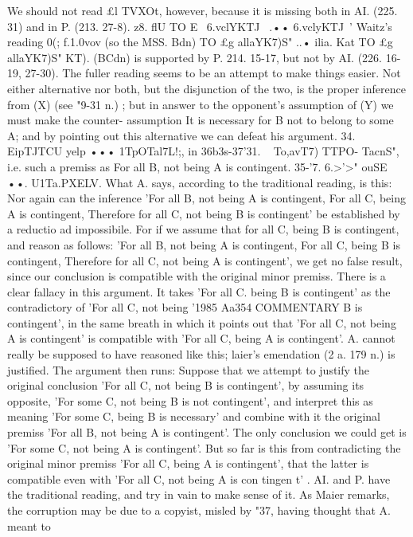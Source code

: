 {{{{{{{{{We should not read £l TVXOt, however, because it is missing both
in AI. (225. 31) and in P. (213. 27-8).
z8. flU TO E~ 6.vclYKTJ~ .•• 6.vclyKTJ~' Waitz's reading 0(; f.1.0vov
(so the MSS. Bdn) TO £g allaYK7)S" ..• ilia. Kat TO £g allaYK7)S" KT).
(BCdn) is supported by P. 214. 15-17, but not by AI. (226. 16-19,
27-30). The fuller reading seems to be an attempt to make things
easier. Not either alternative nor both, but the disjunction of the
two, is the proper inference from (X) (see "9-31 n.) ; but in answer
to the opponent's assumption of (Y) we must make the counter-
assumption It is necessary for B not to belong to some A; and
by pointing out this alternative we can defeat his argument.
34. EipTJTCU yelp ••• 1TpOTal7L!;, in 36b3s-37'31. ~ To,avT7) TTPO-
TacnS", i.e. such a premiss as For all B, not being A is contingent.
35-'7. 6.>'>" ouSE ••. U1Ta.PXELV. What A. says, according to the
traditional reading, is this: Nor again can the inference 'For all
B, not being A is contingent, For all C, being A is contingent,
Therefore for all C, not being B is contingent' be established by
a reductio ad impossibile. For if we assume that for all C, being
B is contingent, and reason as follows: 'For all B, not being A
is contingent, For all C, being B is contingent, Therefore for all
C, not being A is contingent', we get no false result, since our
conclusion is compatible with the original minor premiss.
There is a clear fallacy in this argument. It takes 'For all C.
being B is contingent' as the contradictory of 'For all C, not being
'1985
Aa354
COMMENTARY
B is contingent', in the same breath in which it points out that
'For all C, not being A is contingent' is compatible with 'For all
C, being A is contingent'. A. cannot really be supposed to have
reasoned like this; l\1aier's emendation (2 a. 179 n.) is justified.
The argument then runs: Suppose that we attempt to justify
the original conclusion 'For all C, not being B is contingent', by
assuming its opposite, 'For some C, not being B is not contingent',
and interpret this as meaning 'For some C, being B is necessary'
and combine with it the original premiss 'For all B, not being A
is contingent'. The only conclusion we could get is 'For some
C, not being A is contingent'. But so far is this from contradicting
the original minor premiss 'For all C, being A is contingent', that
the latter is compatible even with 'For all C, not being A is
con tingen t' .
AI. and P. have the traditional reading, and try in vain to
make sense of it. As Maier remarks, the corruption may be due
to a copyist, misled by "37, having thought that A. meant to
}}}}}}}}}
